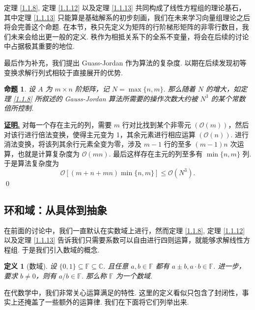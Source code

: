 \documentclass[10pt,openany]{article}
\theoremstyle{thmstyle} %
\theoremstyle{defstyle} %
\newtheorem{definition}[theorem]{定义}
\theoremstyle{prostyle} %
\newtheorem{proposition}[theorem]{命题}
\theoremstyle{exastyle}
\theoremstyle{remstyle}
\renewenvironment{proof}[1][证明]{\par\underline{\textbf{#1.}} \;\fangsong}{\qed\par}
\newcommand{\F}{\mathbb{F}}
\begin{document}
定理 \ref{1.1.8}, 定理 \ref{1.1.12} 以及定理 \ref{1.1.13} 共同构成了线性方程组的理论基石，其中定理 \ref{1.1.13} 只能算是基础解系的初步刻画，我们在未来学习向量组理论之后将会完善这个命题. 在本节，秩只先定义为矩阵的行阶梯形矩阵的非零行数目，我们未来会给出更一般的定义. 秩作为相抵关系下的全系不变量，将会在后续的讨论中占据极其重要的地位.
 
最后作为补充，我们提出 Guass-Jordan 作为算法的复杂度. 以期在后续发现初等变换求解行列式相较于直接展开的优势.

\begin{proposition}
	设 \( A \) 为 \( m \times n \) 阶矩阵，记 \( N=\max\{n,m\} \). 那么随着 \( N \) 的增大，如定理 \ref{1.1.8} 所叙述的 Gauss-Jordan 算法所需要的操作次数大约被 \( N^3 \) 的某个常数倍所控制. 
\end{proposition}

\begin{proof}
	对每一个存在主元的列，需要 \( m \) 行对比找到某个非零元 \( (\mathcal{O}(m)) \)，然后对该行进行倍法变换，使得主元变为 1，其余元素进行相应运算 \( (\mathcal{O}(n)) \). 进行消法变换，将该列其余行元素全变为零，涉及 \( m-1 \) 行的至多 \( (m-1)n \) 次运算，也就是计算复杂度为 \( \mathcal{O}(mn) \). 最后这样存在主元的列至多有 \( \min\{n,m\} \) 列. 于是算法复杂度为
	\[ \mathcal{O}[(m+n+mn)\min\{n,m\}] \leq \mathcal{O}(N^3). \] 
\end{proof}

\subsection{环和域：从具体到抽象}

在前面的讨论中，我们一直默认在实数域上进行，然而定理 \ref{1.1.8}, 定理 \ref{1.1.12} 以及定理 \ref{1.1.13} 告诉我们只需要系数可以自由进行四则运算，就能够求解线性方程组. 于是我们引入数域的概念.

\begin{definition}[数域]	\label{1.2.1}
	设 \( \{0,1\} \subseteq \F \subseteq \mathbb{C} \). 且任意 \( a,b \in \F \) 都有 \( a \pm b, a \cdot b \in \F \). 进一步，要求 \( b \neq 0 \)，则有 \( a/b \in \F \). 那么称 \( \F \) 为一个数域.

\end{definition}

在代数学中，我们非常关心运算满足的特性. 这里的定义看似只包含了封闭性，事实上还掩盖了一些额外的运算律. 我们在下面将它们列举出来.
\end{document}
